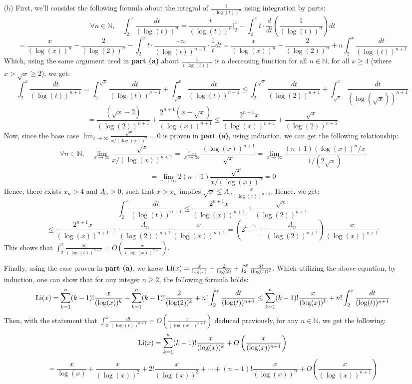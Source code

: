 \documentclass{article}
\begin{document}
\begin{itemize}
    \hfil

    \item[(b)] First, we'll consider the following formula about the integral of $\frac{1}{(\log(t))^n}$ using integration by parts:
    $$\forall n\in\mathbb{N},\quad \int_{2}^{x}\frac{dt}{(\log(t))^n} = \frac{t}{(\log(t))^n}\bigg|_{2}^{x}-\int_{2}^{x}t\cdot\frac{d}{dt}\left(\frac{1}{(\log(t))^n}\right)dt$$
    $$ = \frac{x}{(\log(x))^n}-\frac{2}{(\log(2))^n}-\int_{2}^{x}t\cdot\frac{-n}{(\log(t))^{n+1}}\cdot\frac{1}{t}dt = \frac{x}{(\log(x))^n}-\frac{2}{(\log(2))^n}+n\int_{2}^{x}\frac{dt}{(\log(t))^{n+1}}$$
    Which, using the same argument used in \textbf{part (a)} about $\frac{1}{(\log(t))^n}$ is a decreasing function for all $n\in\mathbb{N}$, for all $x\geq 4$ (where $x>\sqrt{x}\geq 2$), we get:
    $$\int_{2}^{x}\frac{dt}{(\log(t))^{n+1}} = \int_{2}^{\sqrt{x}}\frac{dt}{(\log(t))^{n+1}}+\int_{\sqrt{x}}^{x}\frac{dt}{(\log(t))^{n+1}} \leq \int_{2}^{\sqrt{x}}\frac{dt}{(\log(2))^{n+1}}+\int_{\sqrt{x}}^{x}\frac{dt}{(\log(\sqrt{x}))^{n+1}}$$
    $$=\frac{(\sqrt{x}-2)}{(\log(2))^{n+1}} + \frac{2^{n+1}(x-\sqrt{x})}{(\log(x))^{n+1}} \leq \frac{2^{n+1}x}{(\log(x))^{n+1}}+\frac{\sqrt{x}}{(\log(2))^{n+1}}$$
    Now, since the base case $\lim_{x\rightarrow\infty}\frac{\sqrt{x}}{x/(\log(x))^2}=0$ is proven in \textbf{part (a)}, using induction, we can get the following relationship:
    $$\forall n\in\mathbb{N},\quad \lim_{x\rightarrow\infty}\frac{\sqrt{x}}{x/(\log(x))^{n+1}} = \lim_{x\rightarrow\infty}\frac{(\log(x))^{n+1}}{\sqrt{x}} = \lim_{x\rightarrow\infty}\frac{(n+1)(\log(x))^n/x}{1/(2\sqrt{x})}$$
    $$ = \lim_{x\rightarrow\infty}2(n+1)\frac{\sqrt{x}}{x/(\log(x))^n} = 0$$
    Hence, there exists $x_n>4$ and $A_n>0$, such that $x>x_n$ implies $\sqrt{x}\leq A_n\frac{x}{(\log(x))^{n+1}}$. Hence, we get:
    $$\int_{2}^{x}\frac{dt}{(\log(t))^{n+1}} \leq \frac{2^{n+1}x}{(\log(x))^{n+1}}+\frac{\sqrt{x}}{(\log(2))^{n+1}}$$
    $$ \leq \frac{2^{n+1}x}{(\log(x))^{n+1}}+\frac{A_n}{(\log(2))^{n+1}}\frac{x}{(\log(x))^{n+1}} = \left(2^{n+1}+\frac{A_n}{(\log(2))^{n+1}}\right)\frac{x}{(\log(x))^{n+1}}$$
    This shows that $\int_{2}^{x}\frac{dt}{(\log(t))^{n+1}}=O\left(\frac{x}{(\log(x))^{n+1}}\right)$.

    \hfil

    Finally, using the case proven in \textbf{part (a)}, we know $\textmd{Li}(x)=\frac{x}{\log(x)}-\frac{2}{\log(2)}+\int_{2}^{x}\frac{dt}{(\log(t))^2}$. Which utilizing the above equation, by induction, one can show that for any integer $n\geq 2$, the following formula holds:
    $$\textmd{Li}(x)=\sum_{k=1}^{n}(k-1)!\frac{x}{(\log(x))^k} - \sum_{k=1}^{n}(k-1)!\frac{2}{(\log(2))^k}+n!\int_{2}^{x}\frac{dt}{(\log(t))^{n+1}} \leq \sum_{k=1}^{n}(k-1)!\frac{x}{(\log(x))^k}+n!\int_{2}^{x}\frac{dt}{(\log(t))^{n+1}}$$
    Then, with the statement that $\int_{2}^{x}\frac{dt}{(\log(t))^{n+1}}=O\left(\frac{x}{(\log(x))^{n+1}}\right)$ deduced previously, for any $n\in\mathbb{N}$, we get the following:
    $$\textmd{Li}(x)=\sum_{k=1}^{n}(k-1)!\frac{x}{(\log(x))^{k}}+O\left(\frac{x}{(\log(x))^{n+1}}\right)$$
    $$ = \frac{x}{\log(x)}+\frac{x}{(\log(x))^2}+2!\frac{x}{(\log(x))^3}+\cdots +(n-1)!\frac{x}{(\log(x))^n}+O\left(\frac{x}{(\log(x))^{n+1}}\right)$$


\end{itemize}
\end{document}
